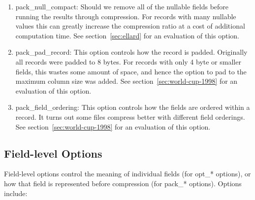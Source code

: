 \begin{enumerate}

\item pack\_null\_compact: Should we remove all of the nullable fields
before running the results through compression.  For records with many
nullable values this can greatly increase the compression ratio at a
cost of additional computation time.  See section~\ref{sec:ellard} for
an evaluation of this option.

\item pack\_pad\_record: This option controls how the record is
padded.  Originally all records were padded to 8 bytes.  For records
with only 4 byte or smaller fields, this wastes some amount of space,
and hence the option to pad to the maximum column size was added.  See
section~\ref{sec:world-cup-1998} for an evaluation of this option.

\item pack\_field\_ordering: This option controls how the fields are
ordered within a record.  It turns out some files compress better with
different field orderings.  See section~\ref{sec:world-cup-1998} for
an evaluation of this option.

\end{enumerate}

\subsection{Field-level Options}

Field-level options control the meaning of individual fields (for
opt\_* options), or how that field is represented before compression
(for pack\_* options).  Options include:


